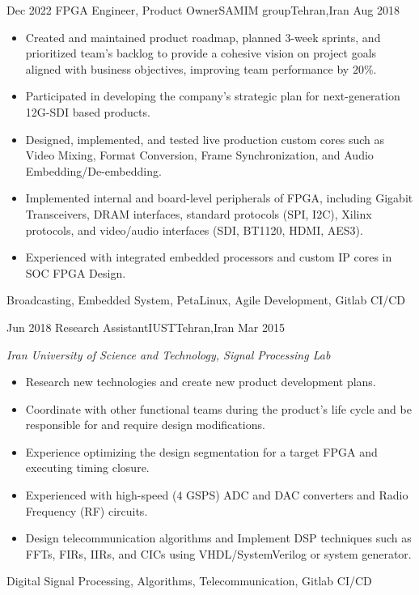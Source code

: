 
\begin{experiences}
	\experience
	{Dec 2022} {FPGA Engineer, Product Owner}{SAMIM group}{Tehran,Iran}
	{Aug 2018} {
		\begin{itemize}
			\item Created and maintained product roadmap, planned 3-week sprints,
			      and prioritized team's backlog to provide a cohesive vision on
			      project goals aligned with business objectives, improving team
			      performance by $20\%$.
			\item Participated in developing the company's strategic plan for
			      next-generation 12G-SDI based products.
			\item Designed, implemented, and tested live production custom cores
			      such as Video Mixing, Format Conversion, Frame Synchronization,
			      and Audio Embedding/De-embedding.
			\item Implemented internal and board-level peripherals of FPGA, including
			      Gigabit Transceivers, DRAM interfaces,
			      standard protocols (SPI, I2C), Xilinx protocols, and video/audio
			      interfaces (SDI, BT1120, HDMI, AES3).
			\item Experienced with integrated embedded processors and custom IP cores
			      in SOC FPGA Design.
		\end{itemize}
	}
	{Broadcasting, Embedded System, PetaLinux, Agile Development, Gitlab CI/CD}
	
	\emptySeparator
	
	\experience
	{Jun 2018} {Research Assistant}{IUST}{Tehran,Iran}
	{Mar 2015} {
		\emph{Iran University of Science and Technology, Signal Processing Lab}
		\begin{itemize}
			\item Research new technologies and create new product development plans.
			\item Coordinate with other functional teams during the product's life
			      cycle and be responsible for and require design modifications.
			\item Experience optimizing the design segmentation for a target FPGA
			      and executing timing closure.
			\item Experienced with high-speed ($4$ GSPS) ADC and DAC converters
			      and Radio Frequency (RF) circuits.
			\item Design telecommunication algorithms and Implement DSP techniques
			      such as FFTs, FIRs, IIRs, and CICs using VHDL/SystemVerilog
			      or system generator.
		\end{itemize}
	}
	{Digital Signal Processing, Algorithms, Telecommunication, Gitlab CI/CD}
	

\end{experiences}
